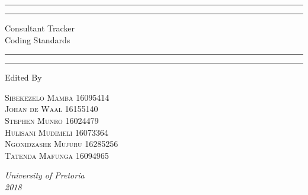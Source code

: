 \documentclass[a4paper,12pt]{report}
\begin{document}
\begin{titlepage} %
	
	\centering %
	
	\scshape %
	
	\vspace*{\baselineskip} %
	
	
	\rule{\textwidth}{1.6pt}\vspace*{-\baselineskip}\vspace*{2pt} %
	\rule{\textwidth}{0.4pt} %
	
	\vspace{0.75\baselineskip} %
	
	{\LARGE Consultant Tracker\\Coding Standards} %
	
	\vspace{0.75\baselineskip} %
	
	\rule{\textwidth}{0.4pt}\vspace*{-\baselineskip}\vspace{3.2pt} %
	\rule{\textwidth}{1.6pt} %
	
	\vspace{2\baselineskip} %
	
	
	
	Edited By
	
	\vspace{0.5\baselineskip} %
	
	{\scshape\Large Sibekezelo Mamba 16095414 \\ Johan de Waal 16155140 \\ Stephen Munro 16024479\\ Hulisani Mudimeli 16073364 \\ Ngonidzashe Mujuru 16285256  \\ Tatenda Mafunga 16094965\\} %
	
	\vspace{0.5\baselineskip} %
	
	\textit{University of Pretoria \\2018} %
	
	\vfill %
	
\end{titlepage}
\newpage
\tableofcontents
\newpage
{}
\end{document}
